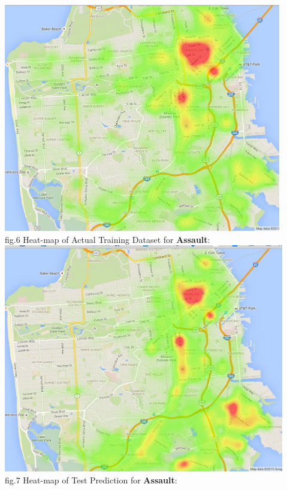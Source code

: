 \documentclass[12pt]{article}
\newenvironment{p4}[2][Part V Results and Evaluation]{\begin{trivlist}
\item[\hskip \labelsep {\bfseries #1}\hskip \labelsep {\bfseries #2}]}{\end{trivlist}}
\begin{document}
\begin{p4}{}
\begin{center}
\includegraphics[height=10cm]{ASSAULT_train.png}\\
fig.6 Heat-map of Actual Training Dataset for \textbf{Assault}:
\\
\includegraphics[height=10cm]{ASSAULT_test.png}\\
fig.7 Heat-map of Test Prediction for \textbf{Assault}:
\end{center}
\end{p4}
\end{document}
